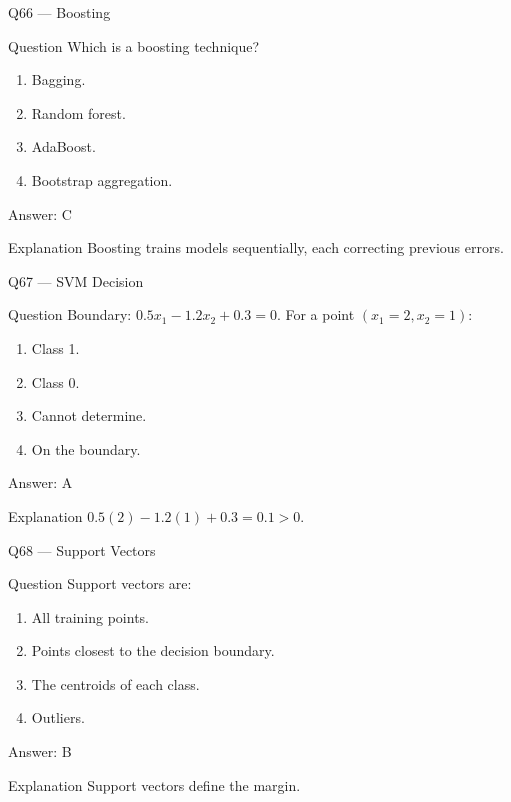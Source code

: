 \documentclass[aspectratio=169,8pt]{beamer}
\begin{document}
	\begin{frame}{Q66 --- Boosting}
		\begin{block}{Question}
			Which is a boosting technique?
		\end{block}
		\begin{enumerate}
			\item Bagging.
			\item Random forest.
			\item AdaBoost.
			\item Bootstrap aggregation.
		\end{enumerate}
		\begin{exampleblock}{Answer: C}\end{exampleblock}
		\begin{block}{Explanation}
			Boosting trains models sequentially, each correcting previous errors.
		\end{block}
	\end{frame}
	
	\begin{frame}{Q67 --- SVM Decision}
		\begin{block}{Question}
			Boundary: $0.5 x_1 - 1.2 x_2 + 0.3 = 0$. For a point $(x_1=2, x_2=1)$:
		\end{block}
		\begin{enumerate}
			\item Class 1.
			\item Class 0.
			\item Cannot determine.
			\item On the boundary.
		\end{enumerate}
		\begin{exampleblock}{Answer: A}\end{exampleblock}
		\begin{block}{Explanation}
			$0.5(2)-1.2(1)+0.3 = 0.1 > 0$.
		\end{block}
	\end{frame}
	
	\begin{frame}{Q68 --- Support Vectors}
		\begin{block}{Question}
			Support vectors are:
		\end{block}
		\begin{enumerate}
			\item All training points.
			\item Points closest to the decision boundary.
			\item The centroids of each class.
			\item Outliers.
		\end{enumerate}
		\begin{exampleblock}{Answer: B}\end{exampleblock}
		\begin{block}{Explanation}
			Support vectors define the margin.
		\end{block}
	\end{frame}
	
\end{document}
